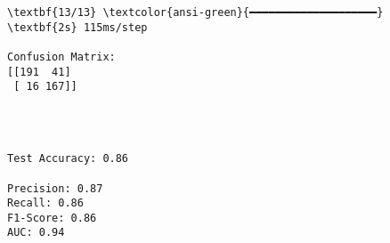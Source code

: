 \documentclass[11pt]{article}
\begin{document}
    \begin{Verbatim}[commandchars=\\\{\}]
\textbf{13/13} \textcolor{ansi-green}{━━━━━━━━━━━━━━━━━━━━} \textbf{2s} 115ms/step

Confusion Matrix:
[[191  41]
 [ 16 167]]
    \end{Verbatim}

    \begin{center}
    \end{center}
    { \hspace*{\fill} \\}
    
    \begin{Verbatim}[commandchars=\\\{\}]

Test Accuracy: 0.86

Precision: 0.87
Recall: 0.86
F1-Score: 0.86
AUC: 0.94
    \end{Verbatim}

    \begin{center}
    \end{center}
    { \hspace*{\fill} \\}
    

    
    
    
\end{document}
